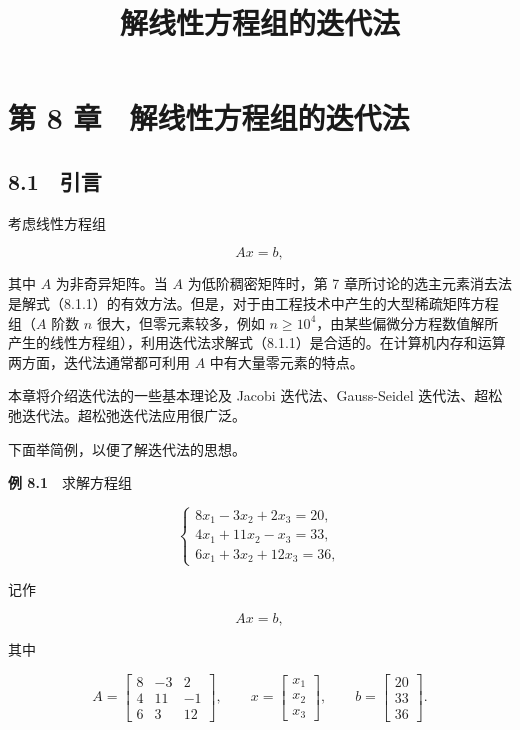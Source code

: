 \documentclass[
  10pt,
  fontset=fandol]{ctexart}
\title{解线性方程组的迭代法}
\author{}
\date{}
\begin{document}
\maketitle

\section{第 8 章　解线性方程组的迭代法}\label{ux7b2c-8-ux7ae0-ux89e3ux7ebfux6027ux65b9ux7a0bux7ec4ux7684ux8fedux4ee3ux6cd5}

\subsection{8.1　引言}\label{ux5f15ux8a00}

考虑线性方程组

\[
Ax=b,
\tag{8.1.1}
\]

其中 \(A\) 为非奇异矩阵。当 \(A\) 为低阶稠密矩阵时，第 7 章所讨论的选主元素消去法是解式（8.1.1）的有效方法。但是，对于由工程技术中产生的大型稀疏矩阵方程组（\(A\) 阶数 \(n\) 很大，但零元素较多，例如 \(n\geqslant10^4\)，由某些偏微分方程数值解所产生的线性方程组），利用迭代法求解式（8.1.1）是合适的。在计算机内存和运算两方面，迭代法通常都可利用 \(A\) 中有大量零元素的特点。

本章将介绍迭代法的一些基本理论及 Jacobi 迭代法、Gauss-Seidel 迭代法、超松弛迭代法。超松弛迭代法应用很广泛。

下面举简例，以便了解迭代法的思想。

\textbf{例 8.1}　求解方程组

\[
\begin{cases}
8x_1-3x_2+2x_3=20,\\
4x_1+11x_2-x_3=33,\\
6x_1+3x_2+12x_3=36,
\end{cases}
\tag{8.1.2}
\]

记作

\[
Ax=b,
\]

其中

\[
A=\begin{bmatrix}8&-3&2\\4&11&-1\\6&3&12\end{bmatrix},\qquad
x=\begin{bmatrix}x_1\\x_2\\x_3\end{bmatrix},\qquad
b=\begin{bmatrix}20\\33\\36\end{bmatrix}.
\]
\end{document}
